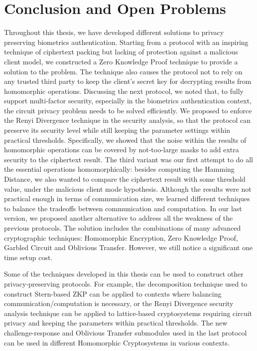 \chapter{Conclusion and Open Problems}
\label{chap:conclusion}

\ifpdf
    \graphicspath{{Chapter8/Figs/Raster/}{Chapter8/Figs/PDF/}{Chapter8/Figs/}}
\else
    \graphicspath{{Chapter8/Figs/Vector/}{Chapter8/Figs/}}
\fi


Throughout this thesis, we have developed different solutions to privacy
preserving biometrics authentication. Starting from a protocol with an inspiring
technique of ciphertext packing but lacking of protection against a malicious
client model, we constructed a Zero Knowledge Proof technique to provide a
solution to the problem. The technique also causes the protocol not to rely on any
trusted third party to keep the client's secret key for decrypting results from
homomorphic operations. Discussing the next protocol, we noted that, to fully support
multi-factor security, especially in the biometrics authentication context, the
circuit privacy problem needs to be solved efficiently. We proposed to enforce the Renyi
Divergence technique in the security analysis, so that the protocol can preserve
its security level while still keeping the parameter settings within practical
thresholds. Specifically, we showed that the noise within the results of homomorphic
operations can be covered by not-too-large masks to add extra security to the
ciphertext result. The third variant was our first attempt to do all the
essential operations homomorphically: besides computing the Hamming
Distance, we also wanted to compare the ciphertext result with some threshold
value, under the malicious client mode hypothesis. Although the results were not practical
enough in terms of communication size, we learned different techniques to
balance the tradeoffs between communication and computation. In our last
version, we proposed another alternative to address all the weakness of the
previous protocols. The solution includes the combinations of many advanced
cryptographic techniques: Homomorphic Encryption, Zero Knowledge Proof, Garbled
Circuit and Oblivious Transfer. However, we still notice a significant one time
setup cost.

Some of the techniques developed in this thesis can be used to construct other
privacy-preserving protocols. For example, the decomposition technique used to
construct Stern-based ZKP can be applied to contexts where balancing
communication/computation is necessary, or the Renyi Divergence security
analysis technique can be applied to lattice-based cryptosystems requiring
circuit privacy and keeping the parameters within practical thresholds. The
new challenge-response and Oblivious Transfer submodules used in the last
protocol can be used in different Homomorphic Cryptosystems in various contexts.


